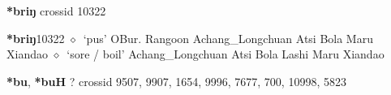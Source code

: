 \item
\textbf{*briŋ}
  {\tiny crossid 10322}
  \begin{list}{}{\leftmargin=1.5em \itemindent=-1.5em}
  \item {\footnotesize \textbf{*briŋ}}{\tiny 10322}
         $\diamond$~`pus'
         OBur. 
\hspace{1ex}
         Rangoon 
\hspace{1ex}
         Achang\_Longchuan 
\hspace{1ex}
         Atsi 
\hspace{1ex}
         Bola 
\hspace{1ex}
         Maru 
\hspace{1ex}
         Xiandao 
\hspace{1ex}
         $\diamond$~`sore / boil'
         Achang\_Longchuan 
\hspace{1ex}
         Atsi 
\hspace{1ex}
         Bola 
\hspace{1ex}
         Lashi 
\hspace{1ex}
         Maru 
\hspace{1ex}
         Xiandao 
  \end{list}
\item
\textbf{*bu}, \textbf{*buH}
?
  {\tiny crossid 9507, 9907, 1654, 9996, 7677, 700, 10998, 5823}
